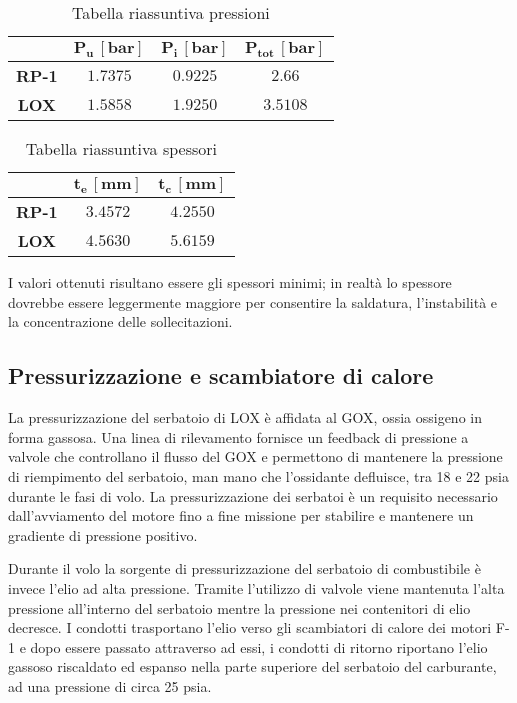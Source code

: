 \begin{table}[H]
\centering
\begin{tabular}{|c|c|c|c|}
\hline
& $\bm{P_{u} \, [bar]}$ & $\bm{P_{i} \, [bar]}$ & $\bm{P_{tot} \, [bar]}$ \\
\hline
\textbf{RP-1} & $1.7375$ & $0.9225$ & $2.66$ \\
\hline
\textbf{LOX} & $1.5858$ & $1.9250$ & $3.5108$\\
\hline
\end{tabular}
\caption{Tabella riassuntiva pressioni}
\label{table:pressioni}
\end{table}

\begin{table}[H]
\centering
\begin{tabular}{|c|c|c|}
\hline
& $\bm{t_{e} \, [mm]}$ & $\bm{t_{c}\, [mm]}$\\
\hline
\textbf{RP-1} & $3.4572$ & $4.2550$\\
\hline
\textbf{LOX} & $4.5630$ & $5.6159$\\
\hline
\end{tabular}
\caption{Tabella riassuntiva spessori}
\label{table:spessori}
\end{table}


I valori ottenuti risultano essere gli spessori minimi; in realtà lo spessore dovrebbe essere leggermente maggiore per consentire la saldatura, l'instabilità e la concentrazione delle sollecitazioni. 

\subsection{Pressurizzazione e scambiatore di calore}
\label{subsec:pressurizzazione_e_scambiatore_di_calore}

La pressurizzazione del serbatoio di LOX è affidata al GOX, ossia ossigeno in forma gassosa. Una linea di rilevamento fornisce un feedback di pressione a valvole che controllano il flusso del GOX e permettono di mantenere la pressione di riempimento del serbatoio, man mano che l’ossidante defluisce, tra 18 e 22 psia durante le fasi di volo. La pressurizzazione dei serbatoi è un requisito necessario dall’avviamento del motore fino a fine missione per stabilire e mantenere un gradiente di pressione positivo.

Durante il volo la sorgente di pressurizzazione del serbatoio di combustibile è invece l’elio ad alta pressione. Tramite l’utilizzo di valvole viene mantenuta l’alta pressione all’interno del serbatoio mentre la pressione nei contenitori di elio decresce. 
I condotti trasportano l’elio verso gli scambiatori di calore dei motori F-1 e dopo essere passato attraverso ad essi, i condotti di ritorno riportano l’elio gassoso riscaldato ed espanso nella parte superiore del serbatoio del carburante, ad una pressione di circa 25 psia.

